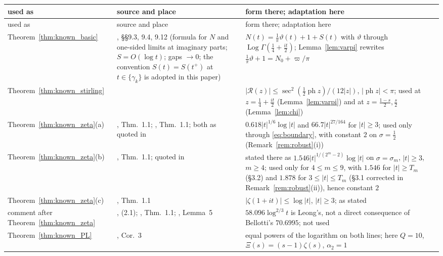 \documentclass[11pt,a4paper]{article}
\makeatletter
\numberwithin{equation}{section}
\DeclareRobustCommand{\CGref}[1]{\ref{#1}}
\DeclareRobustCommand{\CGeqref}[1]{\eqref{#1}}
\DeclareRobustCommand{\CGcite}[2][]{\if\relax\detokenize{#1}\relax\cite{#2}\else\cite[#1]{#2}\fi}
\let\CG@origref\ref
\let\CG@origeqref\eqref
\newcommand{\CG@gettip}[1]{\@ifundefined{CGTip@#1}{#1}{\csname CGTip@#1\endcsname}}
\newcommand{\CG@getbib}[1]{\@ifundefined{CGBib@#1}{#1}{\csname CGBib@#1\endcsname}}
\DeclareRobustCommand{\CGref}[1]{\pdftooltip{\CG@origref{#1}}{\CG@gettip{#1}}}
\DeclareRobustCommand{\CGeqref}[1]{\pdftooltip{\CG@origeqref{#1}}{\CG@gettip{#1}}}
\DeclareRobustCommand{\CGcite}[2][]{\pdftooltip{\if\relax\detokenize{#1}\relax\cite{#2}\else\cite[#1]{#2}\fi}{\CG@getbib{#2}}}
\theoremstyle{definition}
\theoremstyle{remark}
\newcommand{\Nz}{N_0} %
\makeatother
\begin{document}
\begin{center}\small
\begin{longtable}{p{}p{}p{}}
\toprule used as & source and place & form there; adaptation here\\\midrule\endfirsthead
\toprule used as & source and place & form there; adaptation here\\\midrule\endhead
\bottomrule\endfoot
Theorem~\CGref{thm:known_basic} & \CGcite{Titchmarsh1986}, \S\S9.3, 9.4, 9.12 (formula for $N$ and one-sided limits at imaginary parts; $S=O(\log t)$; gaps $\to0$; the convention $S(t)=S(t^+)$ at $t\in\{\gamma_k\}$ is adopted in this paper) & $N(t)=\frac1\pi\vartheta(t)+1+S(t)$ with $\vartheta$ through $\operatorname{Log}\Gamma(\frac14+\frac{it}2)$; Lemma~\CGref{lem:varpi} rewrites $\frac1\pi\vartheta+1=\Nz+\varpi/\pi$\\
Theorem~\CGref{thm:known_stirling} & \CGcite[\S5.11(ii)]{DLMF} & $|\mathcal R(z)|\le\sec^2(\frac12\operatorname{ph}z)/(12|z|)$, $|\operatorname{ph}z|<\pi$; used at $z=\frac14+\frac{it}2$ (Lemma~\CGref{lem:varpi}) and at $z=\frac{1-s}2,\frac s2$ (Lemma~\CGref{lem:chi})\\
Theorem~\CGref{thm:known_zeta}(a) & \CGcite{HiaryPatelYang2024}, Thm.~1.1; \CGcite{PatelYang2023}, Thm.~1.1; both as quoted in \CGcite[\S2, display before (2.3)]{BellottiWong2025} & $0.618|t|^{1/6}\log|t|$ and $66.7|t|^{27/164}$ for $|t|\ge3$; used only through \CGeqref{eq:boundary}, with constant $2$ on $\sigma=\frac12$ (Remark~\CGref{rem:robust}(i))\\
Theorem~\CGref{thm:known_zeta}(b) & \CGcite{Yang2024}, Thm.~1.1; quoted in \CGcite[(2.4)]{BellottiWong2025} & stated there as $1.546|t|^{1/(2^m-2)}\log|t|$ on $\sigma=\sigma_m$, $|t|\ge3$, $m\ge4$; used only for $4\le m\le9$, with $1.546$ for $|t|\ge T_m$ (\S3.2) and $1.878$ for $3\le|t|\le T_m$ (\S3.1 corrected in Remark~\CGref{rem:robust}(ii)), hence constant $2$\\
Theorem~\CGref{thm:known_zeta}(c) & \CGcite{Patel2022}, Thm.~1.1 & $|\zeta(1+it)|\le\log|t|$, $|t|\ge3$; as stated\\
comment after Theorem~\CGref{thm:known_zeta} & \CGcite{BellottiWong2025}, (2.1); \CGcite{Bellotti2024}, Thm.~1.1; \CGcite{Leong2024}, Lemma~5 & $58.096\log^{2/3}t$ is Leong's, not a direct consequence of Bellotti's $70.6995$; not used\\
Theorem~\CGref{thm:known_PL} & \CGcite{Fiori2025}, Cor.~3 & equal powers of the logarithm on both lines; here $Q=10$, $\Xi(s)=(s-1)\zeta(s)$, $\alpha_2=1$\\

\end{longtable}
\end{center}
\end{document}
